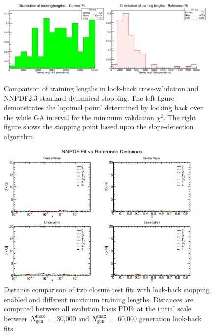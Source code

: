   \begin{figure}[!]
\centering
\includegraphics[width=0.48\textwidth]{7-PostLHC/figs/LB30kvsDYN/tl.eps}
\includegraphics[width=0.48\textwidth]{7-PostLHC/figs/LB30kvsDYN/tl_ref.eps}
\caption[Comparison of training lengths in look-back cross-validation and NNPDF2.3 standard dynamical stopping]{Comparison of training lengths in look-back cross-validation and NNPDF2.3 standard dynamical stopping. The left figure demonstrates the 'optimal point' determined by looking back over the while GA interval for the minimum validation $\chi^2$. The right figure shows the stopping point based upon the slope-detection algorithm.}
\label{fig:30kLBvsDYNtl}
\end{figure}

\begin{figure}[!]
\centering
\includegraphics[width=0.9\textwidth]{7-PostLHC/figs/LB30kvsLB60k/distances_evol.eps}
\caption[Distance comparison of two closure test fits with look-back stopping enabled and different maximum training lengths]{Distance comparison of two closure test fits with look-back stopping enabled and different maximum training lengths. Distances are computed between all evolution basis PDFs at the initial scale between $N_{\text{gen}}^\text{max}=$ 30,000 and $N_{\text{gen}}^\text{max}=$ 60,000 generation look-back fits.}
\label{fig:30kLBvs60kLB}
\end{figure}

